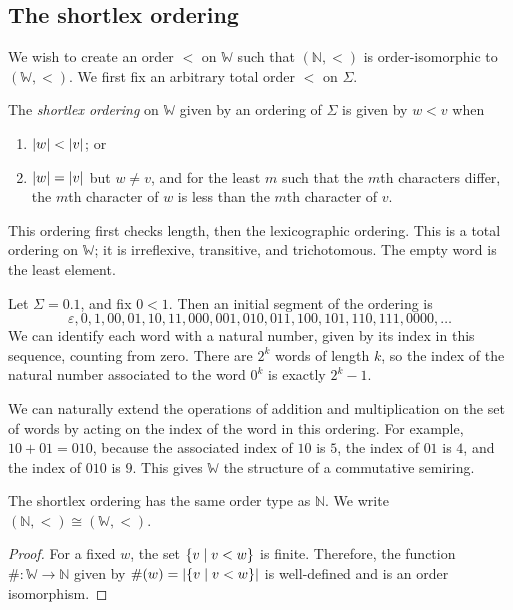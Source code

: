 \subsection{The shortlex ordering}
We wish to create an order \( < \) on \( \mathbb W \) such that \( (\mathbb N, <) \) is order-isomorphic to \( (\mathbb W, <) \).
We first fix an arbitrary total order \( < \) on \( \Sigma \).
\begin{definition}
	The \emph{shortlex ordering} on \( \mathbb W \) given by an ordering of \( \Sigma \) is given by \( w < v \) when
	\begin{enumerate}
		\item \( \abs{w} < \abs{v} \); or
		\item \( \abs{w} = \abs{v} \) but \( w \neq v \), and for the least \( m \) such that the \( m \)th characters differ, the \( m \)th character of \( w \) is less than the \( m \)th character of \( v \).
	\end{enumerate}
\end{definition}
This ordering first checks length, then the lexicographic ordering.
This is a total ordering on \( \mathbb W \); it is irreflexive, transitive, and trichotomous.
The empty word is the least element.
\begin{example}
	Let \( \Sigma = \qty{0,1} \), and fix \( 0 < 1 \).
	Then an initial segment of the ordering is
	\[ \varepsilon, 0, 1, 00, 01, 10, 11, 000, 001, 010, 011, 100, 101, 110, 111, 0000, \dots \]
	We can identify each word with a natural number, given by its index in this sequence, counting from zero.
	There are \( 2^k \) words of length \( k \), so the index of the natural number associated to the word \( 0^k \) is exactly \( 2^k - 1 \).

	We can naturally extend the operations of addition and multiplication on the set of words by acting on the index of the word in this ordering.
	For example, \( 10 + 01 = 010 \), because the associated index of \( 10 \) is \( 5 \), the index of \( 01 \) is \( 4 \), and the index of \( 010 \) is \( 9 \).
	This gives \( \mathbb W \) the structure of a commutative semiring.
\end{example}
\begin{theorem}
	The shortlex ordering has the same order type as \( \mathbb N \).
	We write \( (\mathbb N, <) \cong (\mathbb W, <) \).
\end{theorem}
\begin{proof}
	For a fixed \( w \), the set \( \qty{v \mid v < w} \) is finite.
	Therefore, the function \( \# \colon \mathbb W \to \mathbb N \) given by \( \#(w) = \abs{\qty{v \mid v < w}} \) is well-defined and is an order isomorphism.
\end{proof}
